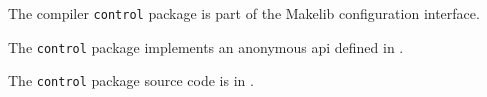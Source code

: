 
The compiler {\tt control} package is part of the Makelib configuration interface.

The {\tt control} package implements an anonymous api defined in .

The {\tt control} package source code is in .



